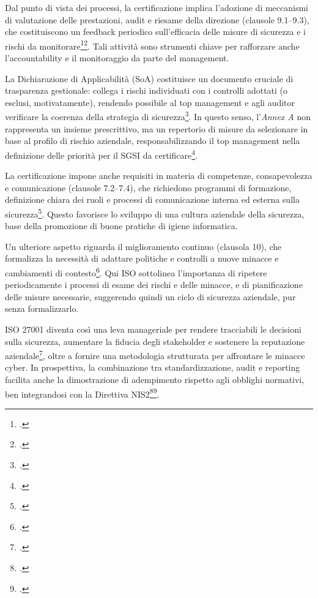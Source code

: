 Dal punto di vista dei processi, la certificazione implica l'adozione di meccanismi di valutazione delle prestazioni, audit e riesame della direzione (clausole 9.1--9.3), 
che costituiscono un feedback periodico sull'efficacia delle misure di sicurezza e i rischi da monitorare\footcite[pp. 8--9]{iso27001}\footcite[p. 2]{mcintosh}. 
Tali attività sono strumenti chiave per rafforzare anche l'accountability e il monitoraggio da parte del management.

La Dichiarazione di Applicabilità (SoA) costituisce un documento cruciale di trasparenza gestionale: collega i rischi individuati con i controlli adottati
(o esclusi, motivatamente), rendendo possibile al top management e agli auditor verificare la coerenza della strategia di sicurezza\footcite[pp. 4--5]{iso27001}.
In questo senso, l'\textit{Annex A} non rappresenta un insieme prescrittivo, ma un repertorio di misure da selezionare in base al profilo di rischio aziendale, 
responsabilizzando il top management nella definizione delle priorità per il SGSI da certificare\footcite[pp. 15--16]{watkins-iso}.

La certificazione impone anche requisiti in materia di competenze, consapevolezza e comunicazione (clausole 7.2--7.4), che richiedono programmi di formazione, 
definizione chiara dei ruoli e processi di comunicazione interna ed esterna sulla sicurezza\footcite[p. 6]{iso27001}. Questo favorisce lo 
sviluppo di una cultura aziendale della sicurezza, base della promozione di buone pratiche di igiene informatica.

Un ulteriore aspetto riguarda il miglioramento continuo (clausola 10), che formalizza la necessità di adattare politiche e controlli a nuove minacce 
e cambiamenti di contesto\footcite[p. 10]{iso27001}. Qui ISO sottolinea l'importanza di ripetere periodicamente i processi di
esame dei rischi e delle minacce, e di pianificazione delle misure necessarie, suggerendo quindi un ciclo di sicurezza aziendale, pur senza formalizzarlo.

ISO 27001 diventa così una leva manageriale per rendere tracciabili le decisioni sulla sicurezza, aumentare la fiducia degli stakeholder e sostenere la 
reputazione aziendale\footcite[p. 7]{watkins-iso}, oltre a fornire una metodologia strutturata per affrontare le minacce cyber. 
In prospettiva, la combinazione tra standardizzazione, audit e reporting facilita anche la dimostrazione di adempimento rispetto agli obblighi normativi, 
ben integrandosi con la Direttiva NIS2\footcite{enisa-implementing-guidance}\footcite{clusit-report}.



